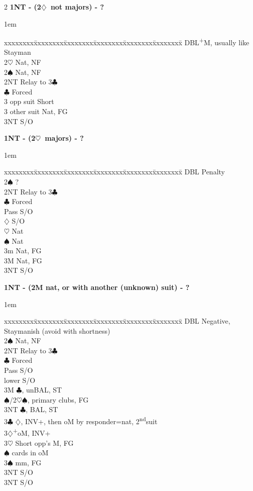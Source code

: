 \documentclass[10pt]{article}
\renewcommand{\c}{$\clubsuit$}
\renewcommand{\d}{$\diamondsuit$}
\newcommand{\h}{$\heartsuit$}
\newcommand{\s}{$\spadesuit$}
\newcommand{\p}{\textsuperscript{+}}
\newcommand{\x}{DBL}
\newcommand{\ndh}{2\textsuperscript{nd}}
\newenvironment{bidtable}[1][]
{\textbf{#1}
  \begin{adjustwidth}{1em}{}
    \addvspace{2pt}
    \begin{tabbing}
      xxxxxxxx\=xxxxxxxx\=xxxxxxxx\=xxxxxxxx\=xxxxxxxx\=xxxxxxxx\=\kill}
{\end{tabbing}\end{adjustwidth}\bigskip}%
\begin{document}
\begin{multicols*}{2}
\begin{bidtable}[1NT - (2\d\ not majors) - ?]
\x           {}\p M, usually like Stayman \\
2\h          \> Nat, NF                     \\
2\s          \> Nat, NF                     \\
2NT          \> Relay to 3\c                \\
             \c \> Forced               \\
3 opp suit   \> Short                       \\
3 other suit \> Nat, FG                     \\
3NT          \> S/O
\end{bidtable}

\begin{bidtable}[1NT - (2\h\ majors) - ?]
\x  \> Penalty            \\
2\s \> ?                  \\
2NT \> Relay to 3\c       \\
    \c \> Forced      \\
    \>     \> Pass \> S/O \\
    \>     \d  \> S/O \\
    \>     \h  \> Nat \\
    \>     \s  \> Nat \\
3m  \> Nat, FG            \\
3M  \> Nat, FG            \\
3NT \> S/O
\end{bidtable}

\begin{bidtable}[1NT - (2M nat, or with another (unknown) suit) - ?]
\x  \> Negative, Staymanish (avoid with shortness)   \\
2\s \> Nat, NF                                       \\
2NT \> Relay to 3\c                                  \\
    \c \> Forced                                 \\
    \>     \> Pass    \> S/O                         \\
    \>      lower \> S/O                         \\
    \>     \> 3M      \> \c, unBAL, ST               \\
    \>     \s/2\h {}\s, primary clubs, FG      \\
    \>     \> 3NT     \> \c, BAL, ST                 \\
3\c \> \d, INV+, then oM by responder=nat, \ndh suit \\
3\d {}\p oM, INV+                                  \\
3\h \> Short opp's M, FG                             \\
    \s {} cards in oM                          \\
3\s \> mm, FG                                        \\
    \> 3NT \> S/O                                    \\
3NT \> S/O
\end{bidtable}


\end{multicols*}
\end{document}

